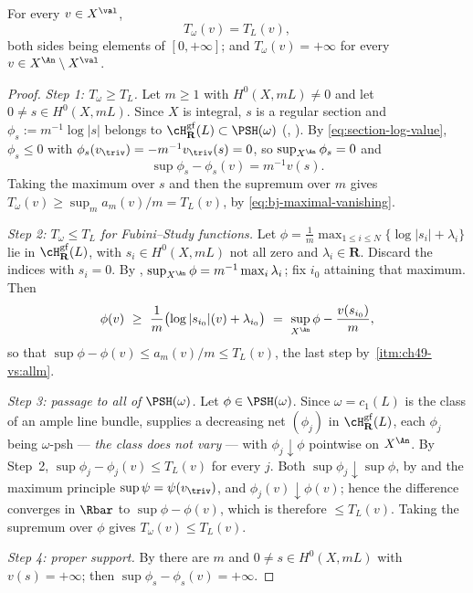 \begin{proposition}
\label{prop:ch49-T-equals-T}
For every $v\in X^{\val}$,
\[
 T_\omega(v)=T_L(v),
\tag{49.6}\label{eq:ch49-T-equals-T}
\]
both sides being elements of $[0,+\infty]$; and $T_\omega(v)=+\infty$
for every $v\in X^{\An}\setminus X^{\val}$.
\end{proposition}

\begin{proof}
\emph{Step 1: $T_\omega\ge T_L$.}  Let $m\ge1$ with $H^0(X,mL)\ne0$
and let $0\ne s\in H^0(X,mL)$.  Since $X$ is integral, $s$ is a
regular section and $\phi_s:=m^{-1}\log|s|$ belongs to
$\cH^{\mathrm{gf}}_{\mathbf R}(L)\subset\PSH(\omega)$
(, ).  By
\eqref{eq:section-log-value}, $\phi_s\le0$ with
$\phi_s(v_{\triv})=-m^{-1}v_{\triv}(s)=0$, so
$\sup_{X^{\An}}\phi_s=0$ and
\[
 \sup\phi_s-\phi_s(v)=m^{-1}v(s).
\]
Taking the maximum over $s$ and then the supremum over $m$ gives
$T_\omega(v)\ge\sup_m a_m(v)/m=T_L(v)$, by
\eqref{eq:bj-maximal-vanishing}.

\emph{Step 2: $T_\omega\le T_L$ for Fubini--Study functions.}  Let
$\phi=\frac1m\max_{1\le i\le N}\{\log|s_i|+\lambda_i\}$ lie in
$\cH^{\mathrm{gf}}_{\mathbf R}(L)$, with $s_i\in H^0(X,mL)$ not all
zero and $\lambda_i\in\mathbf R$.  Discard the indices with $s_i=0$.
By ,
$\sup_{X^{\An}}\phi=m^{-1}\max_i\lambda_i$; fix $i_0$ attaining that
maximum.  Then
\[
 \phi(v)\ \ge\ \frac1m\bigl(\log|s_{i_0}|(v)+\lambda_{i_0}\bigr)
        \ =\ \sup_{X^{\An}}\phi-\frac{v(s_{i_0})}{m},
\]
so that $\sup\phi-\phi(v)\le a_m(v)/m\le T_L(v)$, the last step by
\,\cref{itm:ch49-vs:allm}.

\emph{Step 3: passage to all of $\PSH(\omega)$.}  Let
$\phi\in\PSH(\omega)$.  Since $\omega=c_1(L)$ is the class of an ample
line bundle,  supplies a decreasing net
$(\phi_j)$ in $\cH^{\mathrm{gf}}_{\mathbf R}(L)$, each $\phi_j$ being
$\omega$-psh --- \emph{the class does not vary} --- with
$\phi_j\downarrow\phi$ pointwise on $X^{\An}$.  By Step~2,
$\sup\phi_j-\phi_j(v)\le T_L(v)$ for every $j$.  Both
$\sup\phi_j\downarrow\sup\phi$, by
 and the maximum principle
$\sup\psi=\psi(v_{\triv})$, and $\phi_j(v)\downarrow\phi(v)$; hence the
difference converges in $\Rbar$ to $\sup\phi-\phi(v)$, which is
therefore $\le T_L(v)$.  Taking the supremum over $\phi$ gives
$T_\omega(v)\le T_L(v)$.

\emph{Step 4: proper support.}  By  there are
$m$ and $0\ne s\in H^0(X,mL)$ with $v(s)=+\infty$; then
$\sup\phi_s-\phi_s(v)=+\infty$.
\end{proof}

